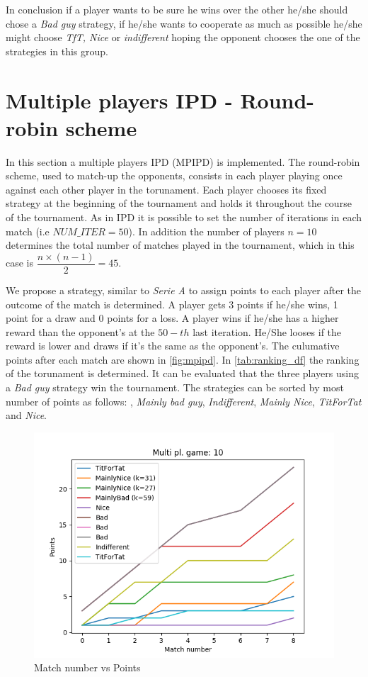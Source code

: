 \documentclass[journal,a4paper,10pt,twoside]{IEEEtran}
\begin{document}
In conclusion if a player wants to be sure he wins over the other he/she should chose a \textit{Bad guy} strategy, if he/she wants to cooperate as much as possible he/she might choose \textit{TfT, Nice} or \textit{indifferent} hoping the opponent chooses the one of the strategies in this group.     

\newpage

\section{Multiple players IPD - Round-robin scheme}
In this section a multiple players IPD (MPIPD) is implemented. The round-robin scheme, used to match-up the opponents, consists in each player playing once against each other player in the torunament.
Each player chooses its fixed strategy at the beginning of the tournament and holds it throughout the course of the tournament.
As in IPD it is possible to set the number of iterations in each match (i.e $NUM\_ITER = 50$). In addition the number of players $n = 10$ determines the total number of matches played in the tournament, which in this case is $\dfrac{n \times (n-1)}{2} = 45$.

We propose a strategy, similar to \textit{Serie A} to assign points to each player after the outcome of the match is determined. A player gets 3 points if he/she wins, 1 point for a draw and 0 points for a loss. A player wins if he/she has a higher reward than the opponent's at the $50-th$ last iteration. He/She looses if the reward is lower and draws if it's the same as the opponent's.
The culumative points after each match are shown in \autoref{fig:mpipd}.
In \autoref{tab:ranking_df} the ranking of the torunament is determined. It can be evaluated that the three players using a \textit{Bad guy} strategy win the tournament.
The strategies can be sorted by most number of points as follows: , \textit{Mainly bad guy}, \textit{Indifferent}, \textit{Mainly Nice}, \textit{TitForTat} and \textit{Nice}.

\begin{figure}
    \centering
    \includegraphics[width=1\columnwidth]{img_v1/idpmp-scores-10.png}
    \caption{Match number vs Points}
    \label{fig:mpipd}
\end{figure}
\end{document}
